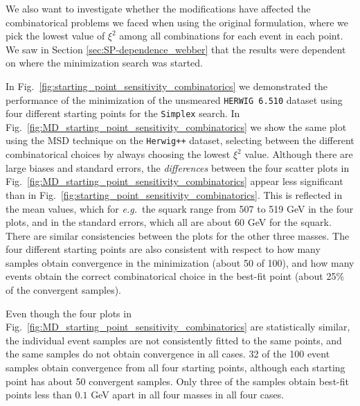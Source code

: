 \documentclass[twoside,english]{uiofysmaster}
\begin{document}
We also want to investigate whether the modifications have affected the combinatorical problems we faced when using the original formulation, where we pick the lowest value of $\xi^2$ among all combinations for each event in each point. We saw in Section \ref{sec:SP-dependence_webber} that the results were dependent on where the minimization search was started. 

In Fig.\ \ref{fig:starting_point_sensitivity_combinatorics} we demonstrated the performance of the minimization of the unsmeared {\tt HERWIG 6.510} dataset using four different starting points for the {\tt Simplex} search. In Fig.\ \ref{fig:MD_starting_point_sensitivity_combinatorics} we show the same plot using the MSD technique on the {\tt Herwig++} dataset, selecting between the different combinatorical choices by always choosing the lowest $\xi^2$ value. Although there are large biases and standard errors, the {\it differences} between the four scatter plots in Fig.\ \ref{fig:MD_starting_point_sensitivity_combinatorics} appear less significant than in Fig.\ \ref{fig:starting_point_sensitivity_combinatorics}. This is reflected in the mean values, which for {\it e.g.}\ the squark range from 507 to 519 GeV in the four plots, and in the standard errors, which all are about 60 GeV for the squark. There are similar consistencies between the plots for the other three masses. The four different starting points are also consistent with respect to how many samples obtain convergence in the minimization (about 50 of 100), and how many events obtain the correct combinatorical choice in the best-fit point (about 25\% of the convergent samples). 

Even though the four plots in Fig.\ \ref{fig:MD_starting_point_sensitivity_combinatorics} are statistically similar, the individual event samples are not consistently fitted to the same points, and the same samples do not obtain convergence in all cases. 32 of the 100 event samples obtain convergence from all four starting points, although each starting point has about 50 convergent samples. Only three of the samples obtain best-fit points less than $0.1$ GeV apart in all four masses in all four cases.
\end{document}
